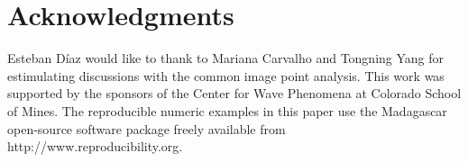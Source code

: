 \section{Acknowledgments}
Esteban D\'{i}az would like to thank to Mariana Carvalho and Tongning Yang for estimulating discussions
with the common image point analysis.
%
This work was supported by the sponsors of the Center for Wave Phenomena at Colorado School of Mines.
%
The reproducible numeric examples in this paper use the Madagascar open-source software package freely available from http://www.reproducibility.org.
%



